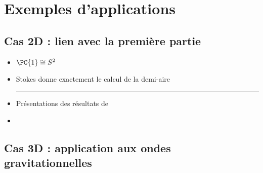 \section{\todo Exemples d'applications} \label{sec:exemples_appli}

\subsection{\todo Cas 2D : lien avec la première partie} \label{subsec:ex-2D}

\begin{itemize}
	
	\item $\PC{1} \cong S^2$
	
	\item Stokes donne exactement le calcul de la demi-aire \\
	
	\hrule
	
	\item Présentations des résultats de \cite{le_bihan_modephysiques_2023}
	
	\item {}
	
\end{itemize}



\subsection{\todo Cas 3D : application aux ondes gravitationnelles} \label{subsec:ex-3D}

